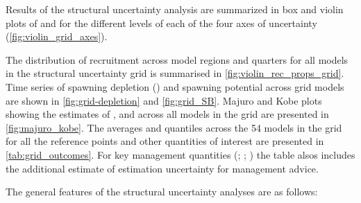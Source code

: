 Results of the structural uncertainty analysis are summarized in box and violin plots of \fref and \sbrsbfo for the different levels of each of the four axes of uncertainty (\autoref{fig:violin_grid_axes}).

The distribution of recruitment across model regions and quarters for all models in the structural uncertainty grid is summarised in \autoref{fig:violin_rec_props_grid}. Time series of spawning depletion (\sbrsbfo) and spawning potential \sb across grid models are shown in \autoref{fig:grid-depletion} and \autoref{fig:grid_SB}. Majuro and Kobe plots showing the estimates of \fref, \sbrsbfo and \sbsbmsy across all models in the grid are presented in \autoref{fig:majuro_kobe}. The averages and quantiles across the 54 models in the grid for all the reference points and other quantities of interest are presented in \autoref{tab:grid_outcomes}. For key management quantities (\sbrsbfo; \fref; \sbrsbmsy) the table alsos includes the additional estimate of estimation uncertainty for management advice.

The general features of the structural uncertainty analyses are as follows:

